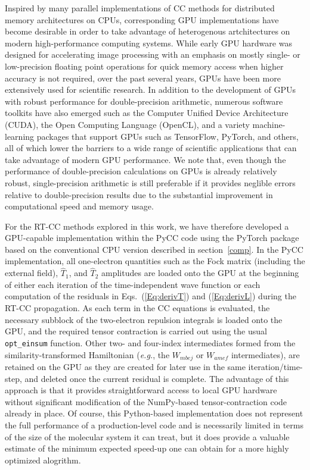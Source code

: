 Inspired by many parallel implementations of CC methods for distributed memory
architectures on CPUs\cite{Olson2007, Solomonik2014, Janowski2007,
Anisimov2014}, corresponding GPU implementations have become desirable in order
to take advantage of heterogenous artchitectures on modern high-performance
computing systems.  While early GPU hardware was designed for accelerating image
processing with an emphasis on mostly single- or low-precision floating point
operations for quick memory access when higher accuracy is not required, over
the past several years, GPUs have been more extensively used for scientific
research.  In addition to the development of GPUs with robust performance for
double-precision arithmetic, numerous software toolkits have also emerged such
as the Computer Unified Device Architecture (CUDA),\cite{cuda} the Open
Computing Language (OpenCL),\cite{Stone2010} and a variety machine-learning
packages that support GPUs such as TensorFlow,\cite{tensorflow2015}
PyTorch,\cite{Paszke2019} and others, all of which lower the barriers to a wide
range of scientific applications that can take advantage of modern GPU
performance.  We note that, even though the performance of double-precision
calculations on GPUs is already relatively robust, single-precision arithmetic
is still preferable if it provides neglible errors relative to double-precision
results due to the substantial improvement in computational speed and memory
usage.  

For the RT-CC methods explored in this work, we have therefore developed a
GPU-capable implementation within the PyCC code using the PyTorch
package\cite{Paszke2019} based on the conventional CPU version described in
section~\ref{comp}.  In the PyCC implementation, all one-electron quantities
such as the Fock matrix (including the external field), $\hat{T}_1$, and
$\hat{T}_2$ amplitudes are loaded onto the GPU at the beginning of either each
iteration of the time-independent wave function or each computation of the
residuals in Eqs.~(\ref{Eq:derivT}) and (\ref{Eq:derivL}) during the RT-CC
propagation.  As each term in the CC equations is evaluated, the necessary
subblock of the two-electron repulsion integrals is loaded onto the GPU, and the
required tensor contraction is carried out using the usual {\tt opt\_einsum}
function.  Other two- and four-index intermediates formed from the
similarity-transformed Hamiltonian (\textit{e.g.}, the $W_{mbej}$ or $W_{amef}$
intermediates), are retained on the GPU as they are created for later use in the
same iteration/time-step, and deleted once the current residual is complete.
The advantage of this approach is that it provides straightforward access to
local GPU hardware without significant modification of the NumPy-based
tensor-contraction code already in place.  Of course, this Python-based
implementation does not represent the full performance of a production-level
code and is necessarily limited in terms of the size of the molecular system it
can treat, but it does provide a valuable estimate of the minimum expected
speed-up one can obtain for a more highly optimized alogrithm.


